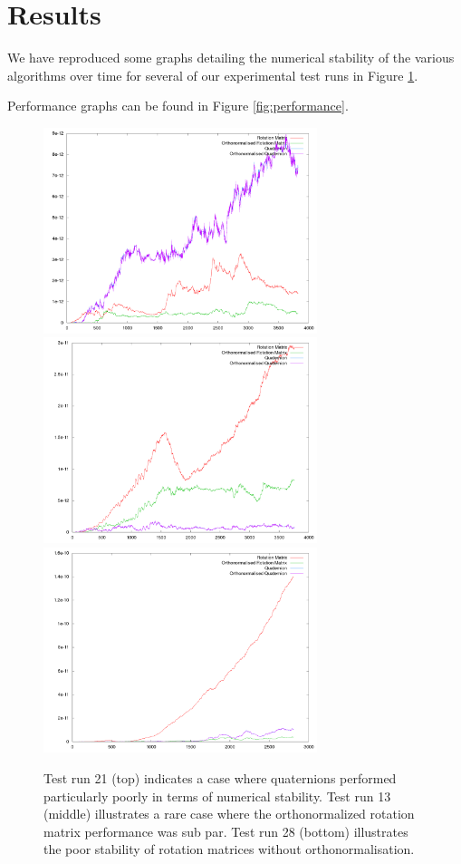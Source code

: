 \documentclass{acm_proc_article-sp}
\begin{document}
\section{Results} 

We have reproduced some graphs detailing the numerical stability of the various algorithms over time for several of our experimental test runs in Figure \ref{fig:stability}.

Performance graphs can be found in Figure \ref{fig:performance}.

\begin{figure}[htpb]
\begin{framed}
\includegraphics[width=8cm]{plots/stability_plot_21.png}
\includegraphics[width=8cm]{plots/stability_plot_13.png}
\includegraphics[width=8cm]{plots/stability_plot_28.png}
\caption{Test run 21 (top) indicates a case where quaternions performed particularly poorly in terms of numerical stability.
Test run 13 (middle) illustrates a rare case where the orthonormalized rotation matrix performance was sub par.
Test run 28 (bottom) illustrates the poor stability of rotation matrices without orthonormalisation.}
\end{framed}
\label{fig:stability}
\end{figure}
\end{document}
